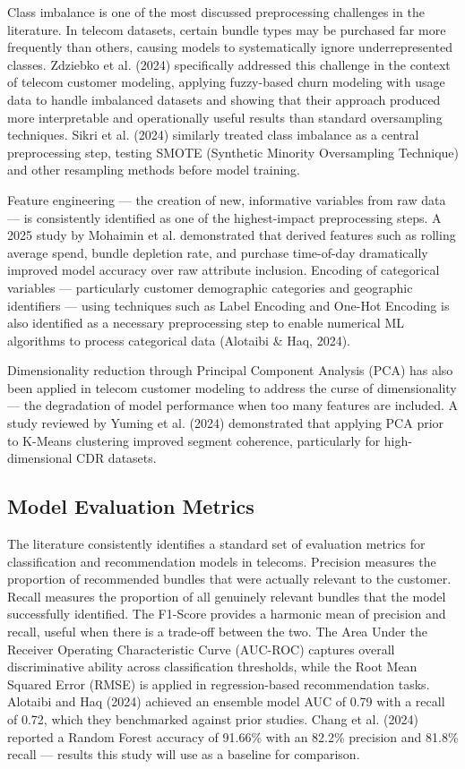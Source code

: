 Class imbalance is one of the most discussed preprocessing challenges in the literature. In telecom datasets, certain bundle types may be purchased far more frequently than others, causing models to systematically ignore underrepresented classes. Zdziebko et al. (2024) specifically addressed this challenge in the context of telecom customer modeling, applying fuzzy-based churn modeling with usage data to handle imbalanced datasets and showing that their approach produced more interpretable and operationally useful results than standard oversampling techniques. Sikri et al. (2024) similarly treated class imbalance as a central preprocessing step, testing SMOTE (Synthetic Minority Oversampling Technique) and other resampling methods before model training.

Feature engineering --- the creation of new, informative variables from raw data --- is consistently identified as one of the highest-impact preprocessing steps. A 2025 study by Mohaimin et al. demonstrated that derived features such as rolling average spend, bundle depletion rate, and purchase time-of-day dramatically improved model accuracy over raw attribute inclusion. Encoding of categorical variables --- particularly customer demographic categories and geographic identifiers --- using techniques such as Label Encoding and One-Hot Encoding is also identified as a necessary preprocessing step to enable numerical ML algorithms to process categorical data (Alotaibi \& Haq, 2024).

Dimensionality reduction through Principal Component Analysis (PCA) has also been applied in telecom customer modeling to address the curse of dimensionality --- the degradation of model performance when too many features are included. A study reviewed by Yuming et al. (2024) demonstrated that applying PCA prior to K-Means clustering improved segment coherence, particularly for high-dimensional CDR datasets.


\subsection{Model Evaluation Metrics}

The literature consistently identifies a standard set of evaluation metrics for classification and recommendation models in telecoms. Precision measures the proportion of recommended bundles that were actually relevant to the customer. Recall measures the proportion of all genuinely relevant bundles that the model successfully identified. The F1-Score provides a harmonic mean of precision and recall, useful when there is a trade-off between the two. The Area Under the Receiver Operating Characteristic Curve (AUC-ROC) captures overall discriminative ability across classification thresholds, while the Root Mean Squared Error (RMSE) is applied in regression-based recommendation tasks. Alotaibi and Haq (2024) achieved an ensemble model AUC of 0.79 with a recall of 0.72, which they benchmarked against prior studies. Chang et al. (2024) reported a Random Forest accuracy of 91.66\% with an 82.2\% precision and 81.8\% recall --- results this study will use as a baseline for comparison.

